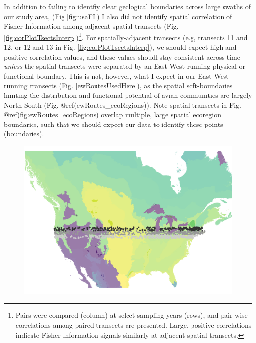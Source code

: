 \documentclass[12pt,twoside,openany]{reedthesis}
\begin{document}
In addition to failing to identfiy clear geological boundaries across large swaths of our study area, (Fig \ref{fig:usaFI}) I also did not identify spatial correlation of Fisher Information among adjacent spatial transects (Fig. \ref{fig:corPlotTsectsInterp})\footnote{Pairs were compared (column) at select sampling years (rows), and pair-wise correlations among paired transects are presented. Large, positive correlations indicate Fisher Information signals similarly at adjacent spatial transects.}. For spatially-adjacent transects (e.g, transects 11 and 12, or 12 and 13 in Fig. \ref{fig:corPlotTsectsInterp}), we should expect high and positive correlation values, and these values shoudl stay consistent across time \emph{unless} the spatial transects were separated by an East-West running physical or functional boundary. This is not, however, what I expect in our East-West running transects (Fig. \ref{ewRoutesUsedHere}), as the spatial soft-boundaries limiting the distribution and functional potential of avian communities are largely North-South (Fig. @ref(ewRoutes\_ecoRegions)). Note spatial transects in Fig. @ref(fig:ewRoutes\_ecoRegions) overlap multiple, large spatial ecoregion boundaries, such that we should expect our data to identify these points (boundaries).
\begin{figure}[h]

{\centering \includegraphics[width=0.75\linewidth]{./chapterFiles/fisherSpatial/figures/figsCalledInDiss/allRoutesUsed_ecoregions} 

}

\end{figure}
\end{document}
